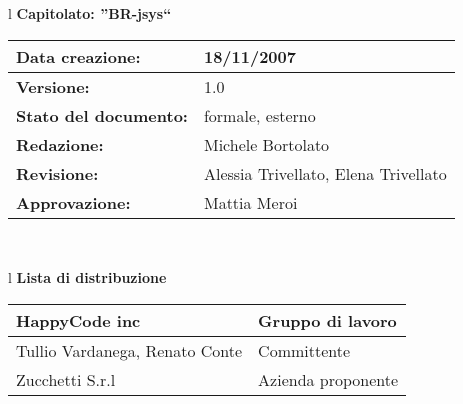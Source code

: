 

\newcommand{\lv}{ 1.0 } %
\newcommand{\dt}{ Specifica Tecnica }%


\begin{center}
\thispagestyle{plain}
\begin{table}[htbp]
\large{
\begin{tabular}{l}
\Large{\textbf{\textsf{Capitolato: ''BR-jsys``}}} \\
\begin{tabular}{||p{6cm}||p{6cm}||} \hline
\textbf{Data creazione:} & 18/11/2007 \\ \hline
\textbf{Versione:} & \lv \\ \hline
\textbf{Stato del documento:} & formale, esterno \\ \hline
\textbf{Redazione:} & Michele Bortolato \\ \hline
\textbf{Revisione:} & Alessia Trivellato, Elena Trivellato  \\ \hline
\textbf{Approvazione:}  & Mattia Meroi \\ \hline
\end{tabular} \\
\end{tabular}
}
\end{table}
\end{center}

\begin{center}
\begin{table}[hbtp]
\large{
\begin{tabular}{l}
\Large{\textbf{\textsf{Lista di distribuzione}}} \\
\begin{tabular}{||p{6cm}||p{6cm}||} \hline
{HappyCode inc}& Gruppo di lavoro\\ \hline
{Tullio Vardanega, Renato Conte}& Committente \\ \hline 
{Zucchetti S.r.l}& Azienda proponente\\ \hline
\end{tabular} \\
\end{tabular}
}
\end{table}
\end{center}

